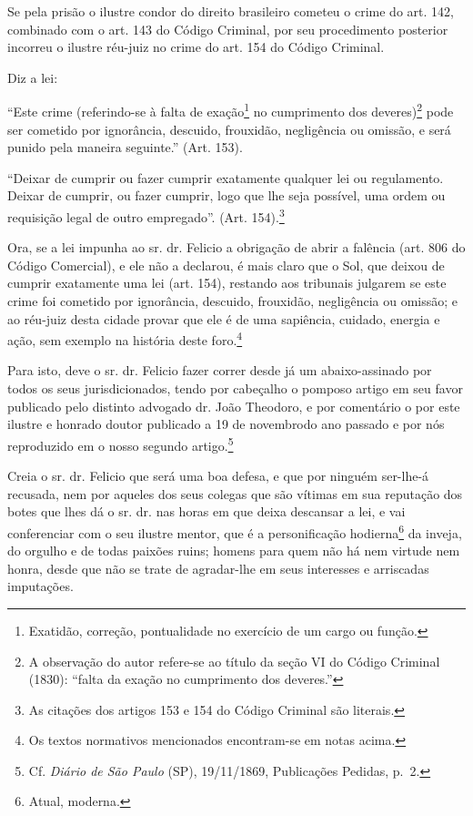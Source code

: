 Se pela prisão o ilustre condor do direito brasileiro cometeu o crime do
art. 142, combinado com o art. 143 do Código Criminal, por seu
procedimento posterior incorreu o ilustre réu-juiz no crime do art. 154
do Código Criminal.

Diz a lei:

``Este crime (referindo-se à falta de exação\footnote{ Exatidão,
  correção, pontualidade no exercício de um cargo ou função.} no
cumprimento dos deveres)\footnote{ A observação do autor refere-se ao
  título da seção VI do Código Criminal (1830): ``falta da exação no
  cumprimento dos deveres.''} pode ser cometido por ignorância, descuido,
frouxidão, negligência ou omissão, e será punido pela maneira seguinte.''
(Art. 153).

``Deixar de cumprir ou fazer cumprir exatamente qualquer lei ou
regulamento. Deixar de cumprir, ou fazer cumprir, logo que lhe seja
possível, uma ordem ou requisição legal de outro empregado''. (Art.
154).\footnote{ As citações dos artigos 153 e 154 do Código Criminal
  são literais.}

Ora, se a lei impunha ao sr. dr. Felicio a obrigação de abrir a falência
(art. 806 do Código Comercial), e ele não a declarou, é mais claro que o
Sol, que deixou de cumprir exatamente uma lei (art. 154), restando aos
tribunais julgarem se este crime foi cometido por ignorância, descuido,
frouxidão, negligência ou omissão; e ao réu-juiz desta cidade provar que
ele é de uma sapiência, cuidado, energia e ação, sem exemplo na história
deste foro.\footnote{ Os textos normativos mencionados encontram-se em
  notas acima.}

Para isto, deve o sr. dr. Felicio fazer correr desde já um
abaixo-assinado por todos os seus jurisdicionados, tendo por cabeçalho o
pomposo artigo em seu favor publicado pelo distinto advogado dr. João
Theodoro, e por comentário o por este ilustre e honrado doutor publicado
a 19 de novembrodo ano passado e por nós reproduzido em o nosso segundo
artigo.\footnote{ Cf. \emph{Diário de São Paulo} (SP), 19/11/1869,
  Publicações Pedidas, p.~2.}

Creia o sr. dr. Felicio que será uma boa defesa, e que por ninguém
ser-lhe-á recusada, nem por aqueles dos seus colegas que são vítimas em
sua reputação dos botes que lhes dá o sr. dr. nas horas em que deixa
descansar a lei, e vai conferenciar com o seu ilustre mentor, que é a
personificação hodierna\footnote{ Atual, moderna.} da inveja, do
orgulho e de todas paixões ruins; homens para quem não há nem virtude
nem honra, desde que não se trate de agradar-lhe em seus interesses e
arriscadas imputações.

